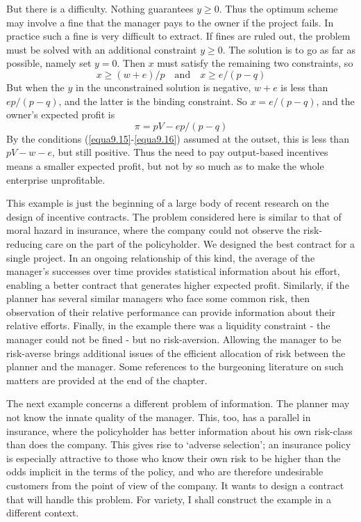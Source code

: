 But there is a difficulty. Nothing guarantees $y \geq 0$. Thus the optimum scheme may involve a fine that the manager pays to the owner if the project fails. In practice such a fine is very difficult to extract. If fines are ruled out, the problem must be solved with an additional constraint $y \geq 0$. The solution is to go as far as possible, namely set $y=0$. Then $x$ must satisfy the remaining two constraints, so 
\begin{equation*}
x \geq (w+e)/p \quad \mbox{and} \quad x \geq e/(p-q)
\end{equation*}
But when the $y$ in the unconstrained solution is negative, $w+e$ is less than $ep/(p-q)$, and the latter is the binding constraint. So $x=e/(p-q)$, and the owner's expected profit is 
\begin{equation*} 
\pi = pV - ep/(p-q)
\end{equation*}
By the conditions (\ref{equa9.15}-\ref{equa9.16}) assumed at the outset, this is less than $pV - w-e$, but still positive. Thus the need to pay output-based incentives means a smaller expected profit, but not by so much as to make the whole enterprise unprofitable.

This example is just the beginning of a large body of recent research on the design of incentive contracts. The problem considered here is similar to that of moral hazard in insurance, where the company could not observe the risk-reducing care on the part of the policyholder. We designed the best contract for a single project. In an ongoing relationship of this kind, the average of the manager's successes over time provides statistical information about his effort, enabling a better contract that generates higher expected profit. Similarly, if the planner has several similar managers who face some common risk, then observation of their relative performance can provide information about their relative efforts. Finally, in the example there was a liquidity constraint - the manager could not be fined - but no risk-aversion. Allowing the manager to be risk-averse brings additional issues of the efficient allocation of risk between the planner and the manager. Some references to the burgeoning literature on such matters are provided at the end of the chapter.

The next example concerns a different problem of information. The planner may not know the innate quality of the manager. This, too, has a parallel in insurance, where the policyholder has better information about his own risk-class than does the company. This gives rise to `adverse selection'; an insurance policy is especially attractive to those who know their own risk to be higher than the odds implicit in the terms of the policy, and who are therefore undesirable customers from the point of view of the company. It wants to design a contract that will handle this problem. For variety, I shall construct the example in a different context.

